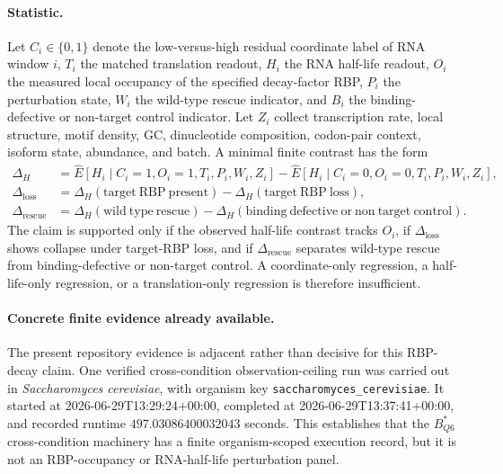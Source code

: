 \paragraph{Statistic.}
Let $C_i \in \{0,1\}$ denote the low-versus-high residual coordinate label of RNA window $i$, $T_i$ the matched translation readout, $H_i$ the RNA half-life readout, $O_i$ the measured local occupancy of the specified decay-factor RBP, $P_i$ the perturbation state, $W_i$ the wild-type rescue indicator, and $B_i$ the binding-defective or non-target control indicator. Let $Z_i$ collect transcription rate, local structure, motif density, GC, dinucleotide composition, codon-pair context, isoform state, abundance, and batch. A minimal finite contrast has the form
$$
\begin{aligned}
\Delta_H
  &= \widehat{E}[H_i \mid C_i=1,O_i=1,T_i,P_i,W_i,Z_i]
   - \widehat{E}[H_i \mid C_i=0,O_i=0,T_i,P_i,W_i,Z_i],\\
\Delta_{\mathrm{loss}}
  &= \Delta_H(\mathrm{target\ RBP\ present})
   - \Delta_H(\mathrm{target\ RBP\ loss}),\\
\Delta_{\mathrm{rescue}}
  &= \Delta_H(\mathrm{wild\ type\ rescue})
   - \Delta_H(\mathrm{binding\ defective\ or\ non\ target\ control}).
\end{aligned}
$$
The claim is supported only if the observed half-life contrast tracks $O_i$, if $\Delta_{\mathrm{loss}}$ shows collapse under target-RBP loss, and if $\Delta_{\mathrm{rescue}}$ separates wild-type rescue from binding-defective or non-target control. A coordinate-only regression, a half-life-only regression, or a translation-only regression is therefore insufficient.

\paragraph{Concrete finite evidence already available.}
The present repository evidence is adjacent rather than decisive for this RBP-decay claim. One verified cross-condition observation-ceiling run was carried out in \emph{Saccharomyces cerevisiae}, with organism key \texttt{saccharomyces\_cerevisiae}. It started at 2026-06-29T13:29:24+00:00, completed at 2026-06-29T13:37:41+00:00, and recorded runtime $497.03086400032043$ seconds. This establishes that the $B^{*}_{Q6}$ cross-condition machinery has a finite organism-scoped execution record, but it is not an RBP-occupancy or RNA-half-life perturbation panel.

